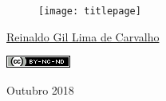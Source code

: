 \thispagestyle{empty}

\begin{center}
  \begin{figure}[H]
    \begin{center}
      \hspace{-1cm}
      \texttt{[image: titlepage]}
  ~\cite{FrontPageIMG}
    \end{center}      
  \end{figure}

  \vskip 2cm

  \hspace{-1cm}
  \begin{minipage}[c]{17cm}
    \begin{center}

{\huge {}\vskip 0.15cm %

{\large \href{http://reinaldoc.wordpress.com}{Reinaldo Gil Lima de Carvalho}} %

{\includegraphics[width=0.1\columnwidth]{imgs/license-CC-BY-NC-ND_header.png}}

}
    \end{center}
  \end{minipage}

  \vskip 14cm

  {\huge Outubro 2018} %
\end{center}
